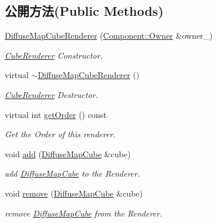 \subsection*{公開方法(Public Methods)}
\begin{DoxyCompactItemize}
\item 
\hyperlink{class_i_dream_sky_1_1_diffuse_map_cube_renderer_a5f354147fc558a450f2105f76878e161}{Diffuse\+Map\+Cube\+Renderer} (\hyperlink{class_i_dream_sky_1_1_component_1_1_owner}{Component\+::\+Owner} \&owner\+\_\+)
\begin{DoxyCompactList}\small\item\em \hyperlink{class_i_dream_sky_1_1_cube_renderer}{Cube\+Renderer} Constructor. \end{DoxyCompactList}\item 
virtual \hyperlink{class_i_dream_sky_1_1_diffuse_map_cube_renderer_a1fcdee05814bfb6473f614c1fdacbeb3}{$\sim$\+Diffuse\+Map\+Cube\+Renderer} ()
\begin{DoxyCompactList}\small\item\em \hyperlink{class_i_dream_sky_1_1_cube_renderer}{Cube\+Renderer} Destructor. \end{DoxyCompactList}\item 
virtual int \hyperlink{class_i_dream_sky_1_1_diffuse_map_cube_renderer_ada517b09adf24db2a094f17021dfe2a2}{get\+Order} () const 
\begin{DoxyCompactList}\small\item\em Get the Order of this renderer. \end{DoxyCompactList}\item 
void \hyperlink{class_i_dream_sky_1_1_diffuse_map_cube_renderer_aec07abb4aac828db3af3b52c2339c0fb}{add} (\hyperlink{class_i_dream_sky_1_1_diffuse_map_cube}{Diffuse\+Map\+Cube} \&cube)
\begin{DoxyCompactList}\small\item\em add \hyperlink{class_i_dream_sky_1_1_diffuse_map_cube}{Diffuse\+Map\+Cube} to the Renderer. \end{DoxyCompactList}\item 
void \hyperlink{class_i_dream_sky_1_1_diffuse_map_cube_renderer_ac02b3206600e1825d321e213d96bcf81}{remove} (\hyperlink{class_i_dream_sky_1_1_diffuse_map_cube}{Diffuse\+Map\+Cube} \&cube)
\begin{DoxyCompactList}\small\item\em remove \hyperlink{class_i_dream_sky_1_1_diffuse_map_cube}{Diffuse\+Map\+Cube} from the Renderer. \end{DoxyCompactList}\end{DoxyCompactItemize}
